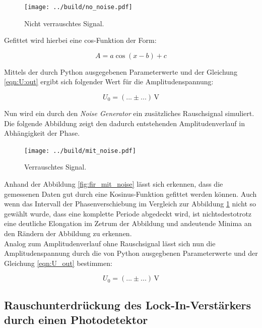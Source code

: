 \begin{figure}[H]
    \texttt{[image: ../build/no\_noise.pdf]}
    \caption{Nicht verrauschtes Signal.}
    \label{fig:fit_no_noise}
\end{figure}

\noindent
Gefittet wird hierbei eine cos-Funktion der Form:

\begin{equation*}
    A = a\cos(x - b) + c
\end{equation*}

\noindent Mittels der durch Python ausgegebenen Parameterwerte und der Gleichung \eqref{eqn:U:out} ergibt sich folgender Wert 
für die Amplitudenspannung:

\begin{equation*}
    U_0 = (... \pm ...)\,\unit{\volt}
\end{equation*}

\noindent Nun wird ein durch den \emph{Noise Generator} ein zusätzliches Rauschsignal simuliert. Die folgende Abbildung zeigt den
dadurch entstehenden Amplitudenverlauf in Abhängigkeit der Phase.

\begin{figure}[H]
    \texttt{[image: ../build/mit\_noise.pdf]}
    \caption{Verrauschtes Signal.}
    \label{fig:fit_mit_noise}
\end{figure}

\noindent
Anhand der Abbildung \ref{fig:fir_mit_noise} lässt sich erkennen, dass die gemessenen Daten gut durch eine Kosinus-Funktion gefittet werden 
können. Auch wenn das Intervall der Phasenverschiebung im Vergleich zur Abbildung \ref{fig:fit_no_noise} nicht so gewählt 
wurde, dass eine komplette Periode abgedeckt wird, ist nichtsdestotrotz eine deutliche Elongation im Zetrum der Abbildung und 
andeutende Minima an den Rändern der Abbildung zu erkennen.\\
Analog zum Amplitudenverlauf ohne Rauschsignal lässt sich nun die Amplitudenspannung durch die von Python ausgegbenen Parameterwerte
und der Gleichung \eqref{eqn:U_out} bestimmen:

\begin{equation*}
    U_0 = (... \pm ...)\,\unit{\volt}
\end{equation*}

\subsection{Rauschunterdrückung des Lock-In-Verstärkers durch einen Photodetektor}

